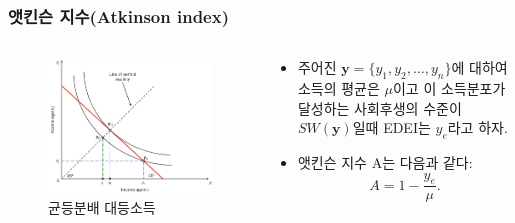 \documentclass[aspectratio=169,xcolor=dvipsnames,]{beamer}
\begin{document}
\begin{frame}[<+->]
\frametitle{앳킨슨 지수(Atkinson index)}
    \begin{columns}
        \begin{column}{.5\textwidth}
            \begin{figure}
                \centering
                \includegraphics[width=.78\textwidth]{pic/eqincome.png}
                \caption{균등분배 대등소득}
            \end{figure}
        \end{column}
        \begin{column}{.5\textwidth}
            \begin{itemize}
                \item 주어진 $\mathbf{y} = \{y_1,y_2, \ldots , y_n \}$에 대하여 소득의 평균은 $\mu$이고 이 소득분포가 달성하는 사회후생의 수준이 $SW(\mathbf{y})$일때 EDEI는 $y_e$라고 하자.
                \item 앳킨슨 지수 A는 다음과 같다:
                $$A = 1- \frac{y_e}{\mu}.$$
            \end{itemize}
        \end{column}
    \end{columns}
\end{frame}
\end{document}
